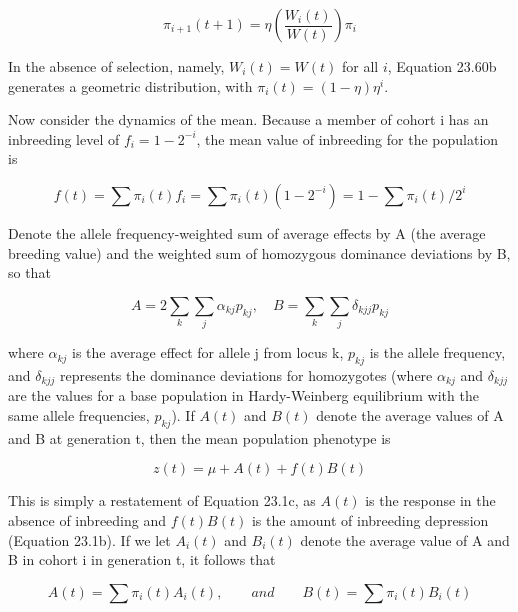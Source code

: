\documentclass{article}
\begin{document}
\begin{equation}
\pi_{i+1}(t+1)=\eta\left(\frac{W_{i}(t)}{W(t)}\right)\pi_{i}
\tag{23.60b}
\label{eq:23_60b}
\end{equation}

In the absence of selection, namely,  $ W_i(t) = W(t) $ for all  $ i $, Equation 23.60b generates a geometric distribution, with  $ \pi_i(t) = (1 - \eta)\eta^i $.

Now consider the dynamics of the mean. Because a member of cohort i has an inbreeding level of  $ f_i = 1 - 2^{-i} $, the mean value of inbreeding for the population is

\begin{equation}
f(t)=\sum\pi_{i}(t)f_{i}=\sum\pi_{i}(t)\left(1-2^{-i}\right)=1-\sum\pi_{i}(t)/2^{i}
\tag{23.61}
\label{eq:23_61}
\end{equation}

Denote the allele frequency-weighted sum of average effects by A (the average breeding value) and the weighted sum of homozygous dominance deviations by B, so that

\begin{equation}
A=2\sum_{k}\sum_{j}\alpha_{kj}p_{kj},\quad B=\sum_{k}\sum_{j}\delta_{kjj}p_{kj}
\tag{23.62}
\label{eq:23_62}
\end{equation}

where  $ \alpha_{kj} $ is the average effect for allele j from locus k,  $ p_{kj} $ is the allele frequency, and  $ \delta_{kjj} $ represents the dominance deviations for homozygotes (where  $ \alpha_{kj} $ and  $ \delta_{kjj} $ are the values for a base population in Hardy-Weinberg equilibrium with the same allele frequencies,  $ p_{kj} $). If  $ A(t) $ and  $ B(t) $ denote the average values of A and B at generation t, then the mean population phenotype is

\begin{equation}
z(t)=\mu+A(t)+f(t)B(t)
\tag{23.63a}
\label{eq:23_63a}
\end{equation}

This is simply a restatement of Equation 23.1c, as  $ A(t) $ is the response in the absence of inbreeding and  $ f(t)B(t) $ is the amount of inbreeding depression (Equation 23.1b). If we let  $ A_{i}(t) $ and  $ B_{i}(t) $ denote the average value of A and B in cohort i in generation t, it follows that

\begin{equation}
A(t)=\sum\pi_{i}(t)A_{i}(t),\qquad and\qquad B(t)=\sum\pi_{i}(t)B_{i}(t)
\tag{23.63b}
\label{eq:23_63b}
\end{equation}
\end{document}
